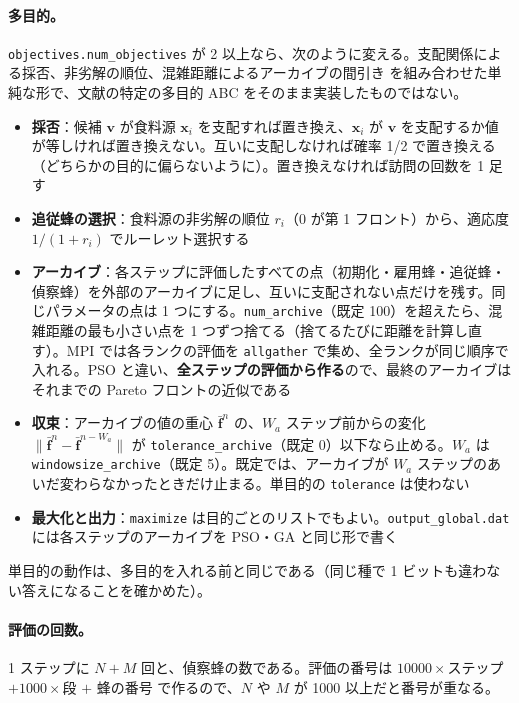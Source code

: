 \documentclass[11pt,a4paper,dvipdfmx]{jsarticle}
\begin{document}
\paragraph{多目的。} \texttt{objectives.num\_objectives} が 2 以上なら、次のように変える。支配関係による採否、非劣解の順位、混雑距離によるアーカイブの間引き \cite{deb2002} を組み合わせた単純な形で、文献の特定の多目的 ABC をそのまま実装したものではない。

\begin{itemize}
\item \textbf{採否}：候補 $\mathbf{v}$ が食料源 $\mathbf{x}_i$ を支配すれば置き換え、$\mathbf{x}_i$ が $\mathbf{v}$ を支配するか値が等しければ置き換えない。互いに支配しなければ確率 1/2 で置き換える（どちらかの目的に偏らないように）。置き換えなければ訪問の回数を 1 足す
\item \textbf{追従蜂の選択}：食料源の非劣解の順位 $r_i$（0 が第 1 フロント）から、適応度 $1/(1 + r_i)$ でルーレット選択する
\item \textbf{アーカイブ}：各ステップに評価したすべての点（初期化・雇用蜂・追従蜂・偵察蜂）を外部のアーカイブに足し、互いに支配されない点だけを残す。同じパラメータの点は 1 つにする。\texttt{num\_archive}（既定 100）を超えたら、混雑距離の最も小さい点を 1 つずつ捨てる（捨てるたびに距離を計算し直す）。MPI では各ランクの評価を \texttt{allgather} で集め、全ランクが同じ順序で入れる。PSO と違い、\textbf{全ステップの評価から作る}ので、最終のアーカイブはそれまでの Pareto フロントの近似である
\item \textbf{収束}：アーカイブの値の重心 $\bar{\mathbf{f}}^n$ の、$W_a$ ステップ前からの変化 $\|\bar{\mathbf{f}}^n - \bar{\mathbf{f}}^{n-W_a}\|$ が \texttt{tolerance\_archive}（既定 0）以下なら止める。$W_a$ は \texttt{windowsize\_archive}（既定 5）。既定では、アーカイブが $W_a$ ステップのあいだ変わらなかったときだけ止まる。単目的の \texttt{tolerance} は使わない
\item \textbf{最大化と出力}：\texttt{maximize} は目的ごとのリストでもよい。\texttt{output\_global.dat} には各ステップのアーカイブを PSO・GA と同じ形で書く
\end{itemize}

単目的の動作は、多目的を入れる前と同じである（同じ種で 1 ビットも違わない答えになることを確かめた）。

\paragraph{評価の回数。} 1 ステップに $N + M$ 回と、偵察蜂の数である。評価の番号は $10000 \times$ステップ $+ 1000 \times$段 $+$ 蜂の番号 で作るので、$N$ や $M$ が 1000 以上だと番号が重なる。
\end{document}
